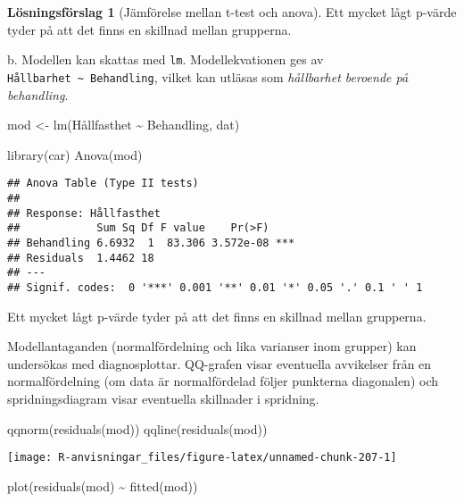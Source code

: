 \documentclass[
]{book}
\newenvironment{Shaded}{\begin{snugshade}}{\end{snugshade}}
\newcommand{\FunctionTok}[1]{\textcolor[rgb]{0.00,0.00,0.00}{#1}}
\newcommand{\NormalTok}[1]{#1}
\newcommand{\OtherTok}[1]{\textcolor[rgb]{0.56,0.35,0.01}{#1}}
\newcommand{\SpecialCharTok}[1]{\textcolor[rgb]{0.00,0.00,0.00}{#1}}
\theoremstyle{definition}
\theoremstyle{definition}
\theoremstyle{definition}
\theoremstyle{definition}
\newtheorem{hypothesis}{Lösningsförslag}[chapter]
\theoremstyle{remark}
\begin{document}
\begin{hypothesis}[Jämförelse mellan t-test och anova]
Ett mycket lågt p-värde tyder på att det finns en skillnad mellan grupperna.

b. Modellen kan skattas med \texttt{lm}. Modellekvationen ges av \texttt{Hållbarhet\ \textasciitilde{}\ Behandling}, vilket kan utläsas som \emph{hållbarhet beroende på behandling}.

\begin{Shaded}
\begin{Highlighting}[]
\NormalTok{mod }\OtherTok{\textless{}{-}} \FunctionTok{lm}\NormalTok{(Hållfasthet }\SpecialCharTok{\textasciitilde{}}\NormalTok{ Behandling, dat)}

\FunctionTok{library}\NormalTok{(car)}
\FunctionTok{Anova}\NormalTok{(mod)}
\end{Highlighting}
\end{Shaded}

\begin{verbatim}
## Anova Table (Type II tests)
## 
## Response: Hållfasthet
##            Sum Sq Df F value    Pr(>F)    
## Behandling 6.6932  1  83.306 3.572e-08 ***
## Residuals  1.4462 18                      
## ---
## Signif. codes:  0 '***' 0.001 '**' 0.01 '*' 0.05 '.' 0.1 ' ' 1
\end{verbatim}

Ett mycket lågt p-värde tyder på att det finns en skillnad mellan grupperna.

Modellantaganden (normalfördelning och lika varianser inom grupper) kan undersökas med diagnosplottar. QQ-grafen visar eventuella avvikelser från en normalfördelning (om data är normalfördelad följer punkterna diagonalen) och spridningsdiagram visar eventuella skillnader i spridning.

\begin{Shaded}
\begin{Highlighting}[]
\FunctionTok{qqnorm}\NormalTok{(}\FunctionTok{residuals}\NormalTok{(mod))}
\FunctionTok{qqline}\NormalTok{(}\FunctionTok{residuals}\NormalTok{(mod))}
\end{Highlighting}
\end{Shaded}

\begin{center}\texttt{[image: R-anvisningar\_files/figure-latex/unnamed-chunk-207-1]} \end{center}

\begin{Shaded}
\begin{Highlighting}[]
\FunctionTok{plot}\NormalTok{(}\FunctionTok{residuals}\NormalTok{(mod) }\SpecialCharTok{\textasciitilde{}} \FunctionTok{fitted}\NormalTok{(mod))}
\end{Highlighting}
\end{Shaded}


\end{hypothesis}
\end{document}
